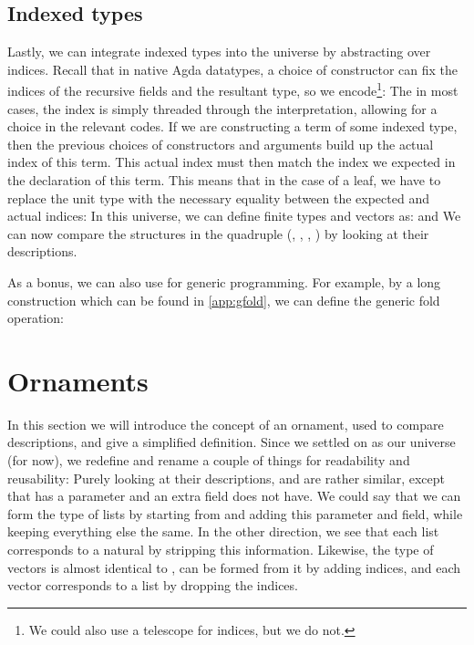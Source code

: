 \subsection{Indexed types}\label{ssec:background-ix}
Lastly, we can integrate indexed types into the universe by abstracting over indices. Recall that in native Agda datatypes, a choice of constructor can fix the indices of the recursive fields and the resultant type, so we encode\footnote{We could also use a telescope for indices, but we do not.}:
The in most cases, the index is simply threaded through the interpretation, allowing for a choice in the relevant codes. If we are constructing a term of some indexed type, then the previous choices of constructors and arguments build up the actual index of this term. This actual index must then match the index we expected in the declaration of this term. This means that in the case of a leaf, we have to replace the unit type with the necessary equality between the expected and actual indices:
In this universe, we can define finite types and vectors as:
and
We can now compare the structures in the quadruple (\bN{}, , , ) by looking at their descriptions.

As a bonus, we can also use  for generic programming. For example, by a long construction which can be found in \autoref{app:gfold}, we can define the generic fold operation:

%

\section{Ornaments}\label{sec:background-ornaments}
In this section we will introduce the concept of an ornament, used to compare descriptions, and give a simplified definition. Since we settled on  as our universe (for now), we redefine and rename a couple of things for readability and reusability:
Purely looking at their descriptions, \bN{} and  are rather similar, except that  has a parameter and an extra field \bN{} does not have. We could say that we can form the type of lists by starting from \bN{} and adding this parameter and field, while keeping everything else the same. In the other direction, we see that each list corresponds to a natural by stripping this information. Likewise, the type of vectors is almost identical to , can be formed from it by adding indices, and each vector corresponds to a list by dropping the indices.

